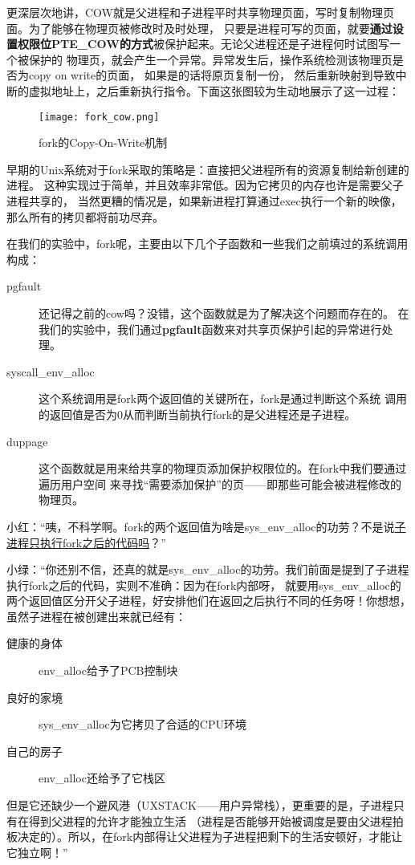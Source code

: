 更深层次地讲，COW就是父进程和子进程平时共享物理页面，写时复制物理页面。为了能够在物理页被修改时及时处理，
只要是进程可写的页面，就要\textbf{通过设置权限位PTE\_COW的方式}被保护起来。\label{页保护与处理}无论父进程还是子进程何时试图写一个被保护的
物理页，就会产生一个异常。异常发生后，操作系统检测该物理页是否为copy on write的页面， 如果是的话将原页复制一份，
然后重新映射到导致中断的虚拟地址上，之后重新执行指令。下面这张图较为生动地展示了这一过程：

\begin{figure}[htbp]
  \centering
  \texttt{[image: fork\_cow.png]}
  \caption{fork的Copy-On-Write机制}\label{fig:fork_cow} 
\end{figure}

\begin{note}
早期的Unix系统对于fork采取的策略是：直接把父进程所有的资源复制给新创建的进程。
这种实现过于简单，并且效率非常低。因为它拷贝的内存也许是需要父子进程共享的，
当然更糟的情况是，如果新进程打算通过exec执行一个新的映像，那么所有的拷贝都将前功尽弃。
\end{note}

在我们的实验中，fork呢，主要由以下几个子函数和一些我们之前填过的系统调用构成：
\begin{description}
 \item [pgfault] 还记得之前的cow吗？没错，这个函数就是为了解决这个问题而存在的。
 在我们的实验中，我们通过\textbf{pgfault}函数来对共享页保护引起的异常进行处理。
 \item [syscall\_env\_alloc] 这个系统调用是fork两个返回值的关键所在，fork是通过判断这个系统
 调用的返回值是否为0从而判断当前执行fork的是父进程还是子进程。
 \item [duppage] 这个函数就是用来给共享的物理页添加保护权限位的。在fork中我们要通过遍历用户空间
 来寻找“需要添加保护”的页——即那些可能会被进程修改的物理页。
\end{description}

\label{fork区分父子进程}
小红：“咦，不科学啊。fork的两个返回值为啥是sys\_env\_alloc的功劳？不是说\hyperref[fork与子进程]{子进程只执行fork之后的代码吗}？”

小绿：“你还别不信，还真的就是sys\_env\_alloc的功劳。我们前面是提到了子进程执行fork之后的代码，实则不准确：因为在fork内部呀，
就要用sys\_env\_alloc的两个返回值区分开父子进程，好安排他们在返回之后执行不同的任务呀！你想想，虽然子进程在被创建出来就已经有：
\begin{description}
 \item [健康的身体]  env\_alloc给予了PCB控制块
 \item [良好的家境]  sys\_env\_alloc为它拷贝了合适的CPU环境
 \item [自己的房子]  env\_alloc还给予了它栈区
\end{description}
\label{父爱如山}
但是它还缺少一个避风港（UXSTACK——用户异常栈），更重要的是，子进程只有在得到父进程的允许才能独立生活
（进程是否能够开始被调度是要由父进程拍板决定的）。所以，在fork内部得让父进程为子进程把剩下的生活安顿好，才能让它独立啊！”

